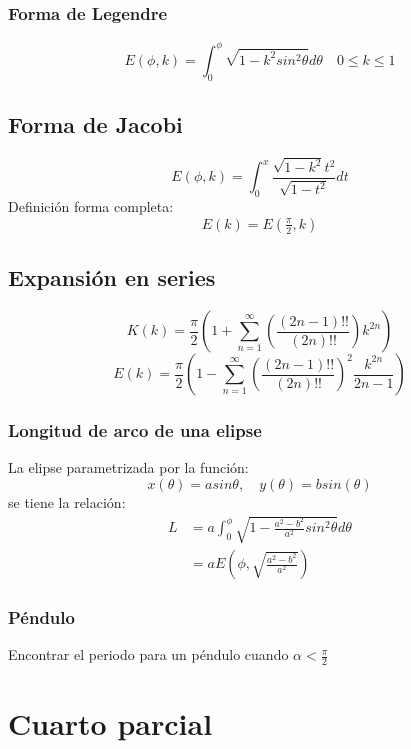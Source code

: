\documentclass{article}
\begin{document}
\subsubsection*{Forma de Legendre}
\[ E(\phi,k) = \int_{0}^\phi \sqrt{1-k^2sin^2\theta}d\theta \quad 0 \leq k \leq 1 \]
\subsection*{Forma de Jacobi}
\[ E(\phi,k) = \int_{0}^x \frac{\sqrt{1-k^2}t^2}{\sqrt{1-t^2}}dt \]
Definición forma completa:
\[ E(k) = E(\tfrac{\pi}{2}, k) \]

\subsection*{Expansión en series}
\[ K(k) = \frac{\pi}{2} \left(1 + \sum_{n=1}^\infty \left( \frac{(2n-1)!!}{(2n)!!} \right)k^{2n} \right) \]
\[ E(k) = \frac{\pi}{2} \left(1- \sum_{n=1}^\infty \left( \frac{(2n-1)!!}{(2n)!!} \right)^2 \frac{k^{2n}}{2n-1} \right) \]

\begin{tcolorbox}[breakable]
    \subsubsection*{Longitud de arco de una elipse}
    La elipse parametrizada por la función:
    \[ x(\theta) = asin\theta, \quad y(\theta) = bsin(\theta) \]
    se tiene la relación:
    \begin{align*}
        L 
        &= a\int_{0}^\phi \sqrt{1-\frac{a^2-b^2}{a^2}sin^2\theta}d\theta\\
        &= aE\left( \phi,\sqrt{\tfrac{a^2-b^2}{a^2}} \right)
    \end{align*}
    \subsubsection*{Péndulo}
    Encontrar el periodo para un péndulo cuando $\alpha	< \frac{\pi}{2}$
    
\end{tcolorbox}

\section*{Cuarto parcial}
\end{document}
